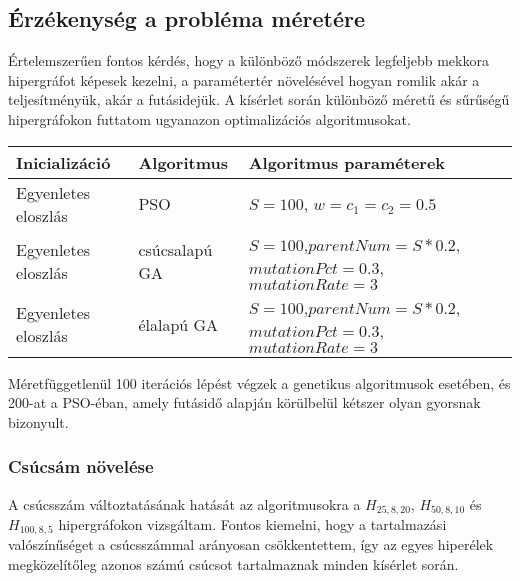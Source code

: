 \subsection{Érzékenység a probléma méretére}

Értelemszerűen fontos kérdés, hogy a különböző módszerek legfeljebb mekkora hipergráfot képesek kezelni, a paramétertér növelésével hogyan romlik akár a teljesítményük, akár a futásidejük. A kísérlet során különböző méretű és sűrűségű hipergráfokon futtatom ugyanazon optimalizációs algoritmusokat.

\begin{longtable}{| p{} | p{} | p{} |}
		\hline
		\hfil \textbf{Inicializáció} & \hfil \textbf{Algoritmus} & \hfil \textbf{Algoritmus paraméterek} \\
		\hline \hline
		\hfil Egyenletes eloszlás & \hfil PSO & $S=100$, $w=c_1=c_2=0.5$\\
		\hline
		\vfil \hfil Egyenletes eloszlás & \vfil \hfil csúcsalapú GA & $S=100$,\newline$parentNum=S*0.2$,\newline$mutationPct=0.3$,\newline$mutationRate=3$\\
		\hline
		\vfil \hfil Egyenletes eloszlás & \vfil \hfil élalapú GA & $S=100$,\newline$parentNum=S*0.2$,\newline$mutationPct=0.3$,\newline$mutationRate=3$ \\
		\hline
\end{longtable}

Méretfüggetlenül 100 iterációs lépést végzek a genetikus algoritmusok esetében, és 200-at a PSO-éban, amely futásidő alapján körülbelül kétszer olyan gyorsnak bizonyult.

\subsubsection{Csúcsám növelése}

A csúcsszám változtatásának hatását az algoritmusokra a $H_{25,8,20}$, $H_{50,8,10}$ és $H_{100,8,5}$ hipergráfokon vizsgáltam. Fontos kiemelni, hogy a tartalmazási valószínűséget a csúcsszámmal arányosan csökkentettem, így az egyes hiperélek megközelítőleg azonos számú csúcsot tartalmaznak minden kísérlet során.


